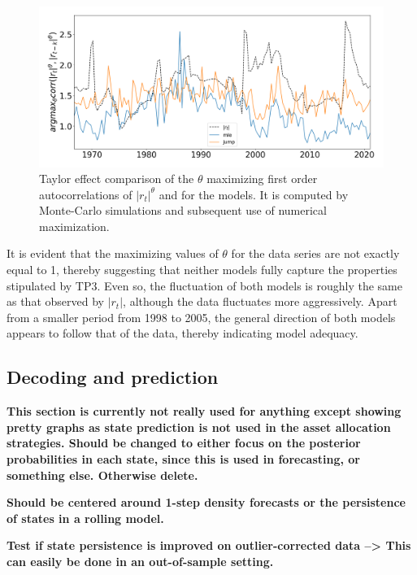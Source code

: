 \begin{figure}[H] 
    \centering
    \includegraphics[width=1.0\textwidth]{analysis/stylized_facts/images/taylor_effect.png}
    \caption[Taylor effect comparison of the $\theta$ maximizing first order autocorrelations of $|r_t|^{\theta}$ and for the models]{Taylor effect comparison of the $\theta$ maximizing first order autocorrelations of $|r_t|^{\theta}$ and for the models. It is computed by Monte-Carlo simulations and subsequent use of numerical maximization.}
    \label{fig:stylized_facts_taylor_effect} 
\end{figure}

It is evident that the maximizing values of $\theta$ for the data series are not exactly equal to 1, thereby suggesting that neither models fully capture the properties stipulated by TP3. Even so, the fluctuation of both models is roughly the same as that observed by $|r_t|$, although the data fluctuates more aggressively. Apart from a smaller period from 1998 to 2005, the general direction of both models appears to follow that of the data, thereby indicating model adequacy.

\subsection{Decoding and prediction}

\textbf{This section is currently not really used for anything except showing pretty graphs as state prediction is not used in the asset allocation strategies. Should be changed to either focus on the posterior probabilities in each state, since this is used in forecasting, or something else. Otherwise delete.}

\textbf{Should be centered around 1-step density forecasts or the persistence of states in a rolling model.}

\textbf{Test if state persistence is improved on outlier-corrected data --> This can easily be done in an out-of-sample setting.}

